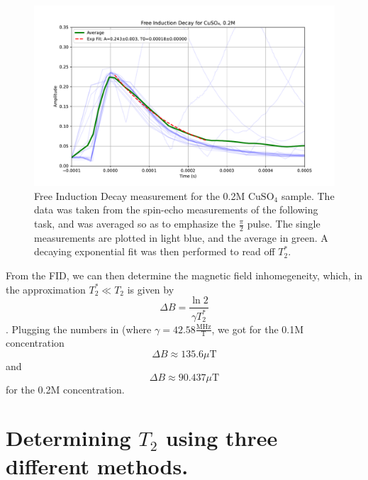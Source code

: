 \documentclass[12pt]{article}
\begin{document}
\begin{figure}[H]
  \includegraphics[scale = 0.5]{Free_Induction_Decay_0.2M.pdf}
  \caption{Free Induction Decay measurement for the 0.2M $\text{CuSO}_4$ sample. The data was taken from the spin-echo measurements of the following task, and was averaged so as to emphasize the $\frac{\pi}{2}$ pulse. The single measurements are plotted in light blue, and the average in green. A decaying exponential fit was then performed to read off $T_2^*$.}
  \label{Free_Induction_Decay_0.2M.pdf}
\end{figure}

From the FID, we can then determine the magnetic field inhomegeneity, which, in the approximation $T_2^* \ll T_2$ is given by \[
\Delta B = \frac{\ln2}{\gamma T_2^*}
\].
Plugging the numbers in (where $\gamma = 42.58 \frac{\text{MHz}}{\text{T}}$, we got for the 0.1M concentration \[
	\Delta B \approx 135.6 \mu\text{T}
\]
and \[
	\Delta B \approx 90.437 \mu\text{T}
\]
for the 0.2M concentration.


%

\section{Determining $T_2$ using three different methods.}
\end{document}
